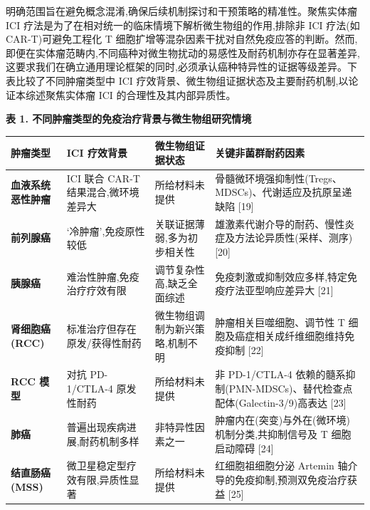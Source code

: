 明确范围旨在避免概念混淆,确保后续机制探讨和干预策略的精准性。聚焦实体瘤 ICI 疗法是为了在相对统一的临床情境下解析微生物组的作用,排除非 ICI 疗法(如 CAR-T)可避免工程化 T 细胞扩增等混杂因素干扰对自然免疫应答的判断。然而,即便在实体瘤范畴内,不同癌种对微生物扰动的易感性及耐药机制亦存在显著差异,这要求我们在确立通用理论框架的同时,必须承认癌种特异性的证据等级差异。下表比较了不同肿瘤类型中 ICI 疗效背景、微生物组证据状态及主要耐药机制,以论证本综述聚焦实体瘤 ICI 的合理性及其内部异质性。

\textbf{表 1. 不同肿瘤类型的免疫治疗背景与微生物组研究情境}

{\def\LTcaptype{none} %
\begin{longtable}[]{@{}
  >{\raggedright\arraybackslash}p{}
  >{\raggedright\arraybackslash}p{}
  >{\raggedright\arraybackslash}p{}
  >{\raggedright\arraybackslash}p{}@{}}
\toprule\noalign{}
\begin{minipage}[b]{\linewidth}\raggedright
肿瘤类型
\end{minipage} & \begin{minipage}[b]{\linewidth}\raggedright
ICI 疗效背景
\end{minipage} & \begin{minipage}[b]{\linewidth}\raggedright
微生物组证据状态
\end{minipage} & \begin{minipage}[b]{\linewidth}\raggedright
关键非菌群耐药因素
\end{minipage} \\
\midrule\noalign{}
\endhead
\bottomrule\noalign{}
\endlastfoot
\textbf{血液系统恶性肿瘤} & ICI 联合 CAR-T 结果混合,微环境差异大 & 所给材料未提供 & 骨髓微环境强抑制性(Tregs、MDSCs)、代谢适应及抗原呈递缺陷 {[}19{]} \\
\textbf{前列腺癌} & `冷肿瘤',免疫原性较低 & 关联证据薄弱,多为初步相关性 & 雄激素代谢介导的耐药、慢性炎症及方法论异质性(采样、测序) {[}20{]} \\
\textbf{胰腺癌} & 难治性肿瘤,免疫治疗疗效有限 & 调节复杂性高,缺乏全面综述 & 免疫刺激或抑制效应多样,特定免疫疗法亚型响应差异大 {[}21{]} \\
\textbf{肾细胞癌(RCC)} & 标准治疗但存在原发/获得性耐药 & 微生物组调制为新兴策略,机制不明 & 肿瘤相关巨噬细胞、调节性 T 细胞及癌症相关成纤维细胞维持免疫抑制 {[}22{]} \\
\textbf{RCC 模型} & 对抗 PD-1/CTLA-4 原发性耐药 & 所给材料未提供 & 非 PD-1/CTLA-4 依赖的髓系抑制(PMN-MDSCs)、替代检查点配体(Galectin-3/9)高表达 {[}23{]} \\
\textbf{肺癌} & 普遍出现疾病进展,耐药机制多样 & 非特异性因素之一 & 肿瘤内在(突变)与外在(微环境)机制分类,共抑制信号及 T 细胞启动障碍 {[}24{]} \\
\textbf{结直肠癌(MSS)} & 微卫星稳定型疗效有限,异质性显著 & 所给材料未提供 & 红细胞祖细胞分泌 Artemin 轴介导的免疫抑制,预测双免疫治疗获益 {[}25{]} \\
\end{longtable}
}

